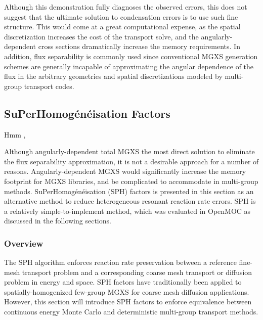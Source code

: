 Although this demonstration fully diagnoses the observed errors, this does not suggest that the ultimate solution to condensation errors is to use such fine structure. This would come at a great computational expense, as the spatial discretization increases the cost of the transport solve, and the angularly-dependent cross sections dramatically increase the memory requirements. In addition, flux separability is commonly used since conventional MGXS generation schemes are generally incapable of approximating the angular dependence of the flux in the arbitrary geometries and spatial discretizations modeled by multi-group transport codes.


\subsection{SuPerHomog\'{e}n\'{e}isation Factors}
\label{subsec:sph}

Hmm \cite{hebert2005ribon}, \cite{hebert1993consistent} \cite{hebert1997advances}

Although angularly-dependent total MGXS the most direct solution to eliminate the flux separability approximation, it is not a desirable approach for a number of reasons. Angularly-dependent MGXS would significantly increase the memory footprint for MGXS libraries, and be complicated to accommodate in multi-group methods. SuPerHomog\'{e}n\'{e}isation (SPH) factors is presented in this section as an alternative method to reduce heterogeneous resonant reaction rate errors. SPH is a relatively simple-to-implement method, which was evaluated in OpenMOC as discussed in the following sections.


\subsubsection{Overview}
\label{subsubsec:sph-overview}

The SPH algorithm enforces reaction rate preservation between a reference fine-mesh transport problem and a corresponding coarse mesh transport or diffusion problem in energy and space. SPH factors have traditionally been applied to spatially-homogenized few-group MGXS for coarse mesh diffusion applications. However, this section will introduce SPH factors to enforce equivalence between continuous energy Monte Carlo and deterministic multi-group transport methods. 

